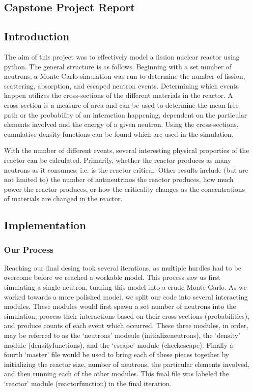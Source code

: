 \documentclass{notes}
\begin{document}
\subsection*{Capstone Project Report}

\subsection*{Introduction}

The aim of this project was to effectively model a fission nuclear reactor using python. The general structure is as follows. Beginning with a set number of neutrons, a Monte Carlo simulation was run to determine the number of fission, scattering, absorption, and escaped neutron events. Determining which events happen utilizes the cross-sections of the different materials in the reactor. A cross-section is a measure of area and can be used to determine the mean free path or the probability of an interaction happening, dependent on the particular elements involved and the energy of a given neutron. Using the cross-sections, cumulative density functions can be found which are used in the simulation. 

With the number of different events, several interesting physical properties of the reactor can be calculated. Primarily, whether the reactor produces as many neutrons as it consumes; i.e. is the reactor critical. Other results include (but are not limited to) the number of antineutrinos the reactor produces, how much power the reactor produces, or how the criticality changes as the concentrations of materials are changed in the reactor.

\subsection*{Implementation}

\subsubsection*{Our Process}

Reaching our final desing took several iterations, as multiple hurdles had to be overcome before we reached a workable model. This process saw us first simulating a single neutron, turning this model into a crude Monte Carlo. As we worked towards a more polished model, we split our code into several interacting modules. These modules would first spawn a set number of neutrons into the simulation, process their interactions based on their cross-sections (probabilities), and produce counts of each event which occurred. These three modules, in order, may be referred to as the `neutrons' modeule (initialize\textunderscore neutrons), the `density' module (density\textunderscore functions), and the `escape' module (check\textunderscore escape). Finally a fourth `master' file would be used to bring each of these pieces together by initializing the reactor size, number of neutrons, the particular elements involved, and then running each of the other modules. This final file was labeled the `reactor' module (reactor\textunderscore function) in the final iteration.
\end{document}
